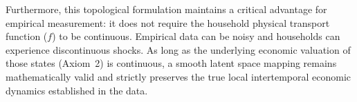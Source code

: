 \documentclass{article}
\begin{document}
Furthermore, this topological formulation maintains a critical advantage for empirical
measurement: it does not require the household physical transport function ($f$) to be
continuous. Empirical data can be noisy and households can experience discontinuous
shocks. As long as the underlying economic valuation of those states (Axiom~2) is
continuous, a smooth latent space mapping remains mathematically valid and strictly
preserves the true local intertemporal economic dynamics established in the data.
\end{document}

